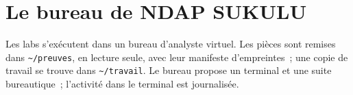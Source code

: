 \section*{Le bureau de NDAP SUKULU}

Les labs s'exécutent dans un bureau d'analyste virtuel. Les pièces sont
remises dans \texttt{\textasciitilde/preuves}, en lecture seule, avec leur
manifeste d'empreintes~; une copie de travail se trouve dans
\texttt{\textasciitilde/travail}. Le bureau propose un terminal et une suite
bureautique~; l'activité dans le terminal est journalisée.
